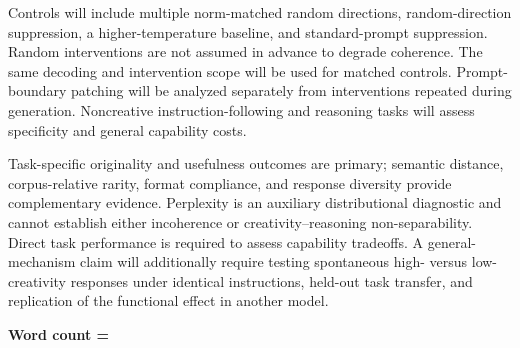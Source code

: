 \documentclass{article}
\begin{document}
Controls will include multiple norm-matched random directions, random-direction suppression, a higher-temperature baseline, and standard-prompt suppression. Random interventions are not assumed in advance to degrade coherence. The same decoding and intervention scope will be used for matched controls. Prompt-boundary patching will be analyzed separately from interventions repeated during generation. Noncreative instruction-following and reasoning tasks will assess specificity and general capability costs.

Task-specific originality and usefulness outcomes are primary; semantic distance, corpus-relative rarity, format compliance, and response diversity provide complementary evidence. Perplexity is an auxiliary distributional diagnostic and cannot establish either incoherence or creativity--reasoning non-separability. Direct task performance is required to assess capability tradeoffs. A general-mechanism claim will additionally require testing spontaneous high- versus low-creativity responses under identical instructions, held-out task transfer, and replication of the functional effect in another model.

\endcountem
\textbf{Word count = \thewordcount{}}
\end{document}
